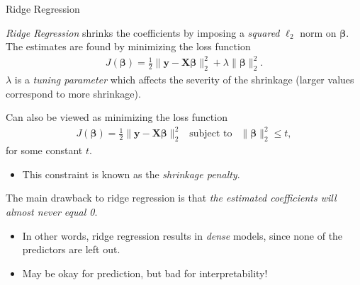 \documentclass[8pt]{beamer}
\newcommand{\mydef}[1]{\textcolor{SteelBlue3}{\textit{#1}}} %
\begin{document}
\begin{frame}{Ridge Regression}

\mydef{Ridge Regression} \cite{hoerl1970ridge} shrinks the coefficients by imposing a \textit{squared} $\ell_2$ norm on $\bm{\beta}$. The estimates are found by minimizing the loss function 
\begin{align*}
    J(\bm{\beta}) = \frac{1}{2} \| \mathbf{y}  - \mathbf{X} \bm{\beta} \|_2^2 + \lambda \| \bm{\beta} \|_2^2.
\end{align*} %
$\lambda$ is a \mydef{tuning parameter} which affects the severity of the shrinkage (larger values correspond to more shrinkage). %

Can also be viewed as minimizing the loss function 
\begin{align*}
    J(\bm{\beta}) = \frac{1}{2} \| \mathbf{y}  - \mathbf{X} \bm{\beta} \|_2^2 ~~\text{ subject to }~~ \| \bm{\beta} \|_2^2 \le t,
\end{align*}
for some constant $t$. %
\begin{itemize}
    \item This constraint is known as the \mydef{shrinkage penalty}.
\end{itemize}

The main drawback to ridge regression is that \textit{the estimated coefficients will almost never equal 0}. %
\begin{itemize}
    \item In other words, ridge regression results in \mydef{dense} models, since none of the predictors are left out. %
    \item May be okay for prediction, but bad for interpretability!
\end{itemize}
    
\end{frame}
\end{document}
